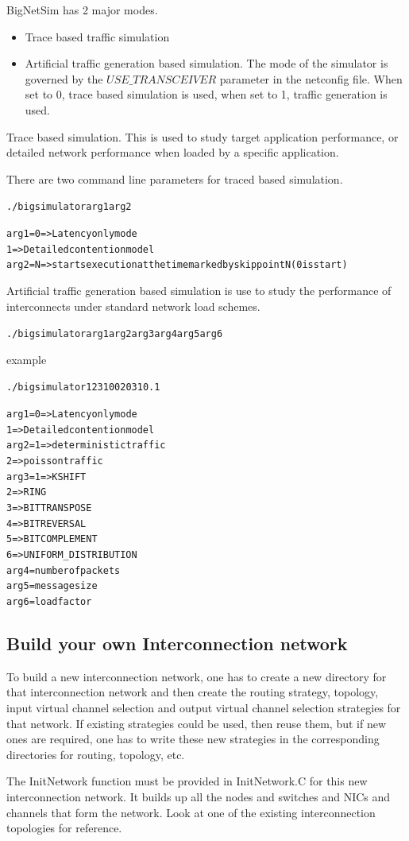 BigNetSim has 2 major modes.  

\begin{itemize}
\item{ Trace based traffic simulation }
\item{Artificial traffic generation based simulation.
The mode of the simulator is governed by the $USE\_TRANSCEIVER$ parameter
in the netconfig file.  When set to 0, trace based simulation is used,
when set to 1, traffic generation is used.}
\end{itemize}

Trace based simulation.  This is used to study target application performance,
or detailed network performance when loaded by a specific application.

There are two command line parameters for traced based simulation.
\begin{alltt}./bigsimulator arg1 arg2\end{alltt}
\begin{alltt}
	arg1 = 0 => Latency only mode
	       1 => Detailed contention model
	arg2 = N => starts execution at the time marked by skip point N	(0 is start) 
\end{alltt}

Artificial traffic generation based simulation is use to study the performance
of interconnects under standard network load schemes.


\begin{alltt}./bigsimulator arg1 arg2 arg3 arg4 arg5 arg6\end{alltt}
example
\begin{alltt}./bigsimulator 1 2 3 100 2031 0.1\end{alltt}

\begin{alltt}
	arg1 = 0 => Latency only mode
	       1 => Detailed contention model
	arg2 = 1 => deterministic traffic
	       2 => poisson traffic
	arg3 = 1 => KSHIFT 
	       2 => RING 
	       3 => BITTRANSPOSE 
	       4 => BITREVERSAL 
	       5 => BITCOMPLEMENT 
	       6 => UNIFORM\_DISTRIBUTION 
	arg4 = number of packets
	arg5 = message size
	arg6 = load factor
\end{alltt}

\subsection{Build your own Interconnection network}
To build a new interconnection network, one has to create a new directory for
that interconnection network and then create the routing strategy, topology,
input virtual channel selection and output virtual channel selection strategies
for that network. If existing strategies could be used, then reuse them, but if
new ones are required, one has to write these new strategies in the
corresponding directories for routing, topology, etc.

The InitNetwork function must be provided in InitNetwork.C for this new
interconnection network. It builds up all the nodes and switches and NICs and
channels that form the network. Look at one of the existing interconnection
topologies for reference.

